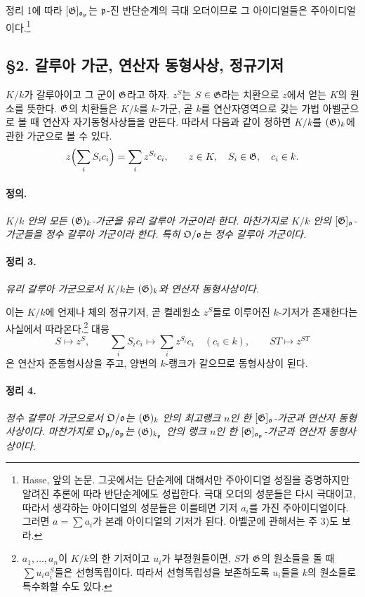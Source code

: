 정리 1에 따라 \([\mathfrak G]_{\mathfrak o_\mathfrak p}\)는 \(\mathfrak p\)-진 반단순계의 극대 오더이므로 그 아이디얼들은 주아이디얼이다.\footnote{Hasse, 앞의 논문. 그곳에서는 단순계에 대해서만 주아이디얼 성질을 증명하지만 알려진 추론에 따라 반단순계에도 성립한다. 극대 오더의 성분들은 다시 극대이고, 따라서 생각하는 아이디얼의 성분들은 이를테면 기저 \(a_i\)를 가진 주아이디얼이다. 그러면 \(a=\sum a_i\)가 본래 아이디얼의 기저가 된다. 아벨군에 관해서는 주 3)도 보라.}

\subsection*{§2. 갈루아 가군, 연산자 동형사상, 정규기저}

\(K/k\)가 갈루아이고 그 군이 \(\mathfrak G\)라고 하자. \(z^S\)는 \(S\in\mathfrak G\)라는 치환으로 \(z\)에서 얻는 \(K\)의 원소를 뜻한다. \(\mathfrak G\)의 치환들은 \(K/k\)를 \(k\)-가군, 곧 \(k\)를 연산자영역으로 갖는 가법 아벨군으로 볼 때 연산자 자기동형사상들을 만든다. 따라서 다음과 같이 정하면 \(K/k\)를 \((\mathfrak G)_k\)에 관한 가군으로 볼 수 있다.
\[
z\Bigl(\sum_i S_i c_i\Bigr)=\sum_i z^{S_i}c_i,
\qquad z\in K,\quad S_i\in\mathfrak G,\quad c_i\in k.
\]

\paragraph{정의.}
\emph{\(K/k\) 안의 모든 \((\mathfrak G)_k\)-가군을 유리 갈루아 가군이라 한다. 마찬가지로 \(K/k\) 안의 \([\mathfrak G]_\mathfrak o\)-가군들을 정수 갈루아 가군이라 한다. 특히 \(\mathfrak O/\mathfrak o\)는 정수 갈루아 가군이다.}

\paragraph{정리 3.}
\emph{유리 갈루아 가군으로서 \(K/k\)는 \((\mathfrak G)_k\)와 연산자 동형사상이다.}

이는 \(K/k\)에 언제나 체의 정규기저, 곧 켤레원소 \(z^S\)들로 이루어진 \(k\)-기저가 존재한다는 사실에서 따라온다.\footnote{\(a_1,\ldots,a_n\)이 \(K/k\)의 한 기저이고 \(u_i\)가 부정원들이면, \(S\)가 \(\mathfrak G\)의 원소들을 돌 때 \(\sum u_i a_i^S\)들은 선형독립이다. 따라서 선형독립성을 보존하도록 \(u_i\)들을 \(k\)의 원소들로 특수화할 수도 있다.} 대응
\[
S\longmapsto z^S,\qquad
\sum_i S_i c_i\longmapsto\sum_i z^{S_i}c_i
\quad(c_i\in k),\qquad
ST\longmapsto z^{ST}
\]
은 연산자 준동형사상을 주고, 양변의 \(k\)-랭크가 같으므로 동형사상이 된다.

\paragraph{정리 4.}
\emph{정수 갈루아 가군으로서 \(\mathfrak O/\mathfrak o\)는 \((\mathfrak G)_k\) 안의 최고랭크 \(n\)인 한 \([\mathfrak G]_\mathfrak o\)-가군과 연산자 동형사상이다. 마찬가지로 \(\mathfrak O_\mathfrak p/\mathfrak o_\mathfrak p\)는 \((\mathfrak G)_{k_\mathfrak p}\) 안의 랭크 \(n\)인 한 \([\mathfrak G]_{\mathfrak o_\mathfrak p}\)-가군과 연산자 동형사상이다.}

